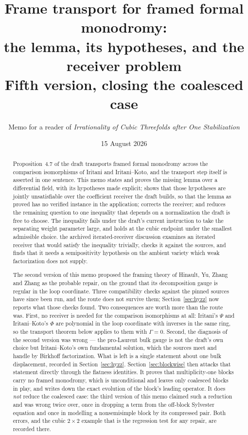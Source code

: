 \documentclass[11pt]{article}
\title{Frame transport for framed formal monodromy:\\
  the lemma, its hypotheses, and the receiver problem\\
  \large Fifth version, closing the coalesced case}
\author{Memo for a reader of \emph{Irrationality of Cubic Threefolds after One
    Stabilization}}
\date{15 August 2026}
\theoremstyle{definition}
\theoremstyle{remark}
\begin{document}
\maketitle

\begin{abstract}
Proposition~4.7 of the draft transports framed formal monodromy across the
comparison isomorphisms of Iritani and Iritani--Koto, and the transport step
itself is asserted in one sentence. This memo states and proves the missing
lemma over a differential field, with its hypotheses made explicit; shows that
those hypotheses are jointly unsatisfiable over the coefficient receiver the
draft builds, so that the lemma as proved has no verified instance in the
application; corrects the receiver; and reduces the remaining question to one
inequality that depends on a normalization the draft is free to choose. The
inequality fails under the draft's current instruction to take the separating
weight parameter large, and holds at the cubic endpoint under the smallest
admissible choice. the archived iterated-receiver discussion examines an iterated receiver that
would satisfy the inequality trivially, checks it against the sources, and finds
that it needs a semipositivity hypothesis on the ambient variety which weak
factorization does not supply.

The second version of this memo proposed the framing theory of Hinault, Yu,
Zhang and Zhang as the probable repair, on the ground that its decomposition
gauge is regular in the loop coordinate. Three compatibility checks against the
pinned sources have since been run, and the route does not survive them;
Section~\ref{sec:hyzz} now reports what those checks found. Two consequences are
worth more than the route was. First, no receiver is needed for the comparison
isomorphisms at all: Iritani's $\Psi$ and Iritani--Koto's $\Phi$ are polynomial
in the loop coordinate with inverses in the same ring, so the transport theorem
below applies to them with $\Gamma=0$. Second, the diagnosis of the second
version was wrong --- the pro-Laurent bulk gauge is not the draft's own choice
but Iritani--Koto's own fundamental solution, which the sources meet and handle
by Birkhoff factorization. What is left is a single statement about one bulk
displacement, recorded in Section~\ref{sec:hyzz}.
Section~\ref{sec:blockwise} then attacks that statement directly through the
flatness identities. It proves that multiplicity-one blocks carry no framed
monodromy, which is unconditional and leaves only coalesced blocks in play, and
writes down the exact evolution of the block's leading operator. It does
\emph{not} reduce the coalesced case: the third version of this memo claimed
such a reduction and was wrong twice over, once in dropping a term from the
off-block Sylvester equation and once in modelling a nonsemisimple block by its
compressed pair. Both errors, and the cubic $2\times2$ example that is the
regression test for any repair, are recorded there.


\end{abstract}
\end{document}
